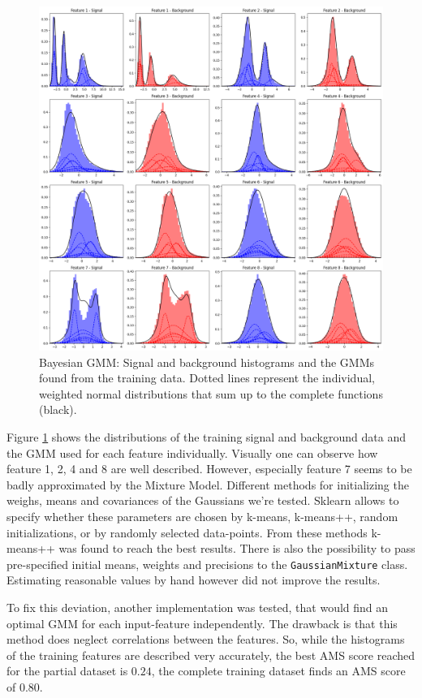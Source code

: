 \begin{figure}
    \centering
    \includegraphics[width=\textwidth]{img/fullmodel.png}
    \caption{Bayesian GMM: Signal and background histograms and the GMMs found from the training data. Dotted lines represent the individual, weighted normal distributions that sum up to the complete functions (black).}
    \label{fig:bgmm-plot}
\end{figure}

Figure \ref{fig:bgmm-plot} shows the distributions of the training signal and background data and the GMM used for each feature individually. Visually one can observe how feature 1, 2, 4 and 8 are well described. However, especially feature 7 seems to be badly approximated by the Mixture Model. Different methods for initializing the weighs, means and covariances of the Gaussians we're tested.
Sklearn allows to specify whether these parameters are chosen by k-means, k-means++, random initializations, or by randomly selected data-points. From these methods k-means++ was found to reach the best results. 
There is also the possibility to pass pre-specified initial means, weights and precisions to the \texttt{GaussianMixture} class. Estimating reasonable values by hand however did not improve the results. 


To fix this deviation, another implementation was tested, that would find an optimal GMM for each input-feature independently. The drawback is that this method does neglect correlations between the features. So, while the histograms of the training features are described very accurately, the best AMS score reached for the partial dataset is $0.24$, the complete training dataset finds an AMS score of $0.80$.



